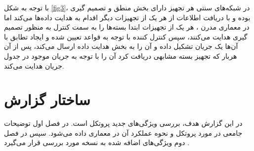 با توجه به شکل \ref{fig3}، در شبکه‌های سنتی هر تجهیز دارای بخش منطق و تصمیم گیری بوده و با دریافت اطلاعات از هر یک از تجهیزات دیگر اقدام به هدایت داده‌ها می‌کند اما در معماری مدرن ، هر یک از تجهیزات ابتدا بسته‌ها را به سمت کنترل به منظور تصمیم گیری هدایت می‌کنند، سپس کنترل کننده با توجه به قواعد تعیین شده و ایجاد تطابق با آن‌ها یک جریان تشکیل داده و آن را به بخش هدایت داده ارسال می‌کند، پس از آن هربار که تجهیز بسته مشابهی دریافت کرد آن را با توجه به جریان موجود در جدول جریان هدایت می‌کند.

\section{ساختار گزارش}
در این گزارش هدف، بررسی ویژگی‌های جدید پروتکل  است. در فصل اول توضیحات جامعی در مورد پروتکل  و نحوه عملکرد آن در معماری  داده می‌شود. سپس در فصل دوم ویژگی‌های اضافه شده به نسخه‌  مورد بررسی قرار می‌گیرد .





